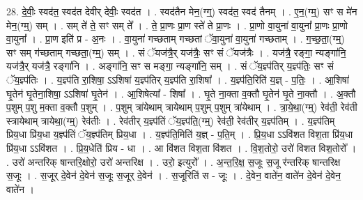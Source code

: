 \documentclass[17pt]{extarticle}
\begin{document}
28. दे॒वीः॒ स्वद॑त॒ स्वद॑त देवीर् देवीः॒ स्वद॑त । . स्वद॑तैन मेन॒(ग्ग्॒) स्वद॑त॒ स्वद॑ तैनम् । . ए॒न॒(ग्म्॒) सꣳ स मे॑न मेन॒(ग्म्॒) सम् । . सम् ते॑ ते॒ सꣳ सम् ते᳚ । . ते॒ प्रा॒णः प्रा॒ण स्ते॑ ते प्रा॒णः । . प्रा॒णो वा॒युना॑ वा॒युना᳚ प्रा॒णः प्रा॒णो वा॒युना᳚ । . प्रा॒ण इति॑ प्र - अ॒नः । . वा॒युना॑ गच्छताम् गच्छतां ॅवा॒युना॑ वा॒युना॑ गच्छताम् । . ग॒च्छ॒ता॒(ग्म्॒) सꣳ सम् ग॑च्छताम् गच्छता॒(ग्म्॒) सम् । . सं ॅयज॑त्रै॒र् यज॑त्रैः॒ सꣳ सं ॅयज॑त्रैः । . यज॑त्रै॒ रङ्गा॒ न्यङ्गा॑नि॒ यज॑त्रै॒र् यज॑त्रै॒ रङ्गा॑नि । . अङ्गा॑नि॒ सꣳ स मङ्गा॒ न्यङ्गा॑नि॒ सम् । . सं ॅय॒ज्ञ्प॑तिर् य॒ज्ञ्प॑तिः॒ सꣳ सं ॅय॒ज्ञ्प॑तिः । . य॒ज्ञ्प॑ति रा॒शिषा॒ ऽऽशिषा॑ य॒ज्ञ्प॑तिर् य॒ज्ञ्प॑ति रा॒शिषा᳚ । . य॒ज्ञ्प॑ति॒रिति॑ य॒ज्ञ् - प॒तिः॒ । . आ॒शिषा॑ घृ॒तेन॑ घृ॒तेना॒शिषा॒ ऽऽशिषा॑ घृ॒तेन॑ । . आ॒शिषेत्या᳚ - शिषा᳚ । . घृ॒ते ना॒क्ता व॒क्तौ घृ॒तेन॑ घृ॒ते ना॒क्तौ । . अ॒क्तौ प॒शुम् प॒शु म॒क्ता व॒क्तौ प॒शुम् । . प॒शुम् त्रा॑येथाम् त्रायेथाम् प॒शुम् प॒शुम् त्रा॑येथाम् । . त्रा॒ये॒था॒(ग्म्॒) रेव॑ती॒ रेव॑ती स्त्रायेथाम् त्रायेथा॒(ग्म्॒) रेव॑तीः । . रेव॑तीर् य॒ज्ञ्प॑तिं ॅय॒ज्ञ्प॑ति॒(ग्म्॒) रेव॑ती॒ रेव॑तीर् य॒ज्ञ्प॑तिम् । . य॒ज्ञ्प॑तिम् प्रिय॒धा प्रि॑य॒धा य॒ज्ञ्प॑तिं ॅय॒ज्ञ्प॑तिम् प्रिय॒धा । . य॒ज्ञ्प॑ति॒मिति॑ य॒ज्ञ् - प॒ति॒म् । . प्रि॒य॒धा ऽऽवि॑शत विश॒ता प्रि॑य॒धा प्रि॑य॒धा ऽऽवि॑शत । . प्रि॒य॒धेति॑ प्रिय - धा । . आ वि॑शत विश॒ता वि॑शत । . वि॒श॒तोरो॒ उरो॑ विशत विश॒तोरो᳚ । . उरो॑ अन्तरिक् षान्तरि॒क्षोरो॒ उरो॑ अन्तरिक्ष । . उरो॒ इत्युरो᳚ । . अ॒न्त॒रि॒क्ष॒ स॒जूः स॒जू र॑न्तरिक् षान्तरिक्ष स॒जूः । . स॒जूर् दे॒वेन॑ दे॒वेन॑ स॒जूः स॒जूर् दे॒वेन॑ । . स॒जूरिति॑ स - जूः । . दे॒वेन॒ वाते॑न॒ वाते॑न दे॒वेन॑ दे॒वेन॒ वाते॑न । \newline
\end{document}
